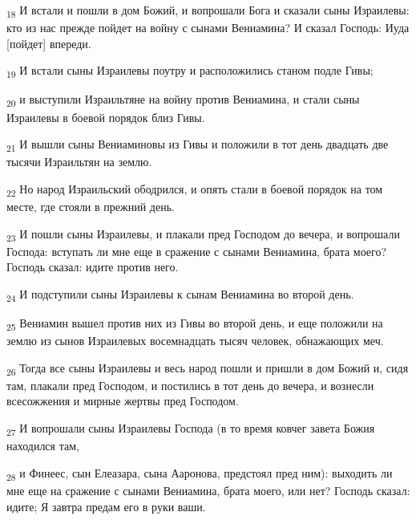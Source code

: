 \begin{tcolorbox}
\textsubscript{18} И встали и пошли в дом Божий, и вопрошали Бога и сказали сыны Израилевы: кто из нас прежде пойдет на войну с сынами Вениамина? И сказал Господь: Иуда [пойдет] впереди.
\end{tcolorbox}
\begin{tcolorbox}
\textsubscript{19} И встали сыны Израилевы поутру и расположились станом подле Гивы;
\end{tcolorbox}
\begin{tcolorbox}
\textsubscript{20} и выступили Израильтяне на войну против Вениамина, и стали сыны Израилевы в боевой порядок близ Гивы.
\end{tcolorbox}
\begin{tcolorbox}
\textsubscript{21} И вышли сыны Вениаминовы из Гивы и положили в тот день двадцать две тысячи Израильтян на землю.
\end{tcolorbox}
\begin{tcolorbox}
\textsubscript{22} Но народ Израильский ободрился, и опять стали в боевой порядок на том месте, где стояли в прежний день.
\end{tcolorbox}
\begin{tcolorbox}
\textsubscript{23} И пошли сыны Израилевы, и плакали пред Господом до вечера, и вопрошали Господа: вступать ли мне еще в сражение с сынами Вениамина, брата моего? Господь сказал: идите против него.
\end{tcolorbox}
\begin{tcolorbox}
\textsubscript{24} И подступили сыны Израилевы к сынам Вениамина во второй день.
\end{tcolorbox}
\begin{tcolorbox}
\textsubscript{25} Вениамин вышел против них из Гивы во второй день, и еще положили на землю из сынов Израилевых восемнадцать тысяч человек, обнажающих меч.
\end{tcolorbox}
\begin{tcolorbox}
\textsubscript{26} Тогда все сыны Израилевы и весь народ пошли и пришли в дом Божий и, сидя там, плакали пред Господом, и постились в тот день до вечера, и вознесли всесожжения и мирные жертвы пред Господом.
\end{tcolorbox}
\begin{tcolorbox}
\textsubscript{27} И вопрошали сыны Израилевы Господа (в то время ковчег завета Божия находился там,
\end{tcolorbox}
\begin{tcolorbox}
\textsubscript{28} и Финеес, сын Елеазара, сына Ааронова, предстоял пред ним): выходить ли мне еще на сражение с сынами Вениамина, брата моего, или нет? Господь сказал: идите; Я завтра предам его в руки ваши.
\end{tcolorbox}
